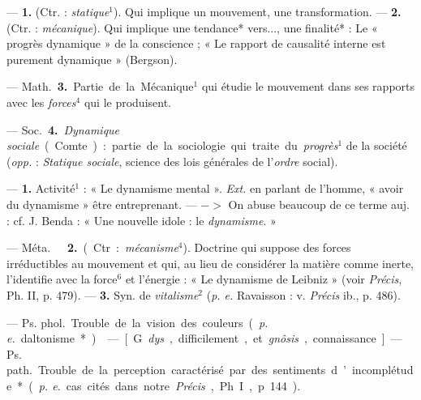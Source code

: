 \begin{itemize}[leftmargin=1cm, label=, itemsep=1pt]
 — {\bf 1.} (Ctr. : {\it statique}$^1$). Qui implique un mouvement, une transformation. — {\bf 2.}
(Ctr. : {\it mécanique}). Qui implique une
tendance* vers..., une finalité* : Le
« progrès dynamique » de la conscience ; « Le rapport de causalité
interne est purement dynamique »
(Bergson).

 — \si{Math.} {\bf 3.} Partie
de la Mécanique$^1$ qui étudie le mouvement dans ses rapports avec les
{\it forces}$^4$ qui le produisent.

— \si{Soc.} {\bf 4.} {\it Dynamique sociale}
(Comte) : partie de la sociologie qui
traite du {\it progrès}$^1$ de la société ({\it opp.} :
{\it Statique sociale}, science des lois
générales de l’{\it ordre} social).

 — {\bf 1.}  Activité$^1$ : « Le
dynamisme mental ». {\it Ext.} en parlant de l’homme, « avoir du dynamisme » être entreprenant. —
$->$ On abuse beaucoup de ce terme
auj. : cf. J. Benda : « Une nouvelle
idole : le {\it dynamisme}. »

— \si{Méta.}   {\bf 2.}
(Ctr. : {\it mécanisme}$^4$). Doctrine qui suppose des
forces irréductibles au mouvement et qui, au lieu de considérer la
matière comme inerte, l'identifie
avec la force$^6$ et l'énergie : « Le
dynamisme de Leibniz » (voir  {\it Précis},
Ph. II, p. 479). — {\bf 3.} Syn. de {\it vitalisme}$^2$ ({\it p. e.} Ravaisson : v.  {\it Précis}
ib., p. 486).

 — \si{Ps. phol.} Trouble
de la vision des couleurs ({\it p. e.} daltonisme*).

 — [G. {\it dys}, difficilement, et
{\it gnôsis}, connaissance] — \si{Ps. path.}
Trouble de la perception caractérisé 
par des sentiments d’incomplétude*
({\it p. e.} cas cités dans notre  {\it Précis},
Ph. I, p. 144).

	\end{itemize}
